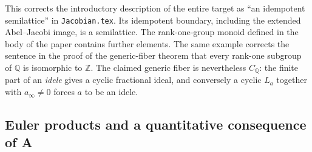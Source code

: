 \begin{remark}
This corrects the introductory description of the entire target as
``an idempotent semilattice'' in \texttt{Jacobian.tex}.  Its
idempotent boundary, including the extended Abel--Jacobi image, is a
semilattice.  The rank-one-group monoid defined in the body of the
paper contains further elements.  The same example corrects the
sentence in the proof of the generic-fiber theorem that every rank-one
subgroup of $\mathbb Q$ is isomorphic to $\mathbb Z$.  The claimed
generic fiber is nevertheless $C_{\mathbb Q}$: the finite part of an
\emph{idele} gives a cyclic fractional ideal, and conversely a cyclic
$L_a$ together with $a_\infty\ne0$ forces $a$ to be an idele.
\end{remark}

\subsection{Euler products and a quantitative consequence of A}

